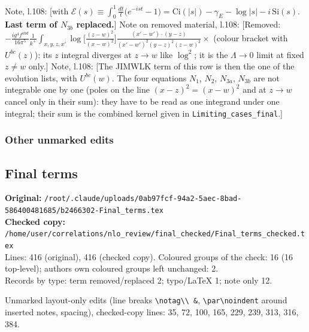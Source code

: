 \documentclass[10pt]{article}
\newenvironment{notebox}{\def\FrameCommand{{\color{notebar}\vrule width 1.5pt}\hspace{6pt}}\MakeFramed{\advance\hsize-\width\FrameRestore}\small}{\endMakeFramed}
\begin{document}
\begin{notebox}\textsf{\small Note, l.108:} [with $\mathcal{E}(s)\equiv\int_{0}^{1}\frac{dt}{t}\big(e^{-ist}-1\big)=\mathrm{Ci}(|s|)-\gamma_{E}-\log|s|-i\,\mathrm{Si}(s)$. \textbf{Last term of $N_{3b}$ replaced.}]\end{notebox}
\begin{notebox}\textsf{\small Note on removed material, l.108:} [Removed: $-\frac{ig^{4}f^{abd}}{16\pi^{5}}\frac{1}{k^{+}}\int_{x,y,z,x'}\log\big[\frac{(z-w)^{2}}{(x-w)^{2}}\big]\frac{(x'-w')\cdot(y-z)}{(x'-w')^{2}(y-z)^{2}(z-w)^{2}}\times$ (colour bracket with $U^{bc}(z)$): its $z$ integral diverges at $z\to w$ like $\log^{2}$; it is the $\Lambda\to0$ limit at fixed $z\neq w$ only.]\end{notebox}
\begin{notebox}\textsf{\small Note, l.108:} [The JIMWLK term of this row is then the one of the evolution lists, with $U^{bc}(w)$. The four equations $N_{1}$, $N_{2}$, $N_{3a}$, $N_{3b}$ are not integrable one by one (poles on the line $(x-z)^{2}=(x-w)^{2}$ and at $z\to w$ cancel only in their sum): they have to be read as one integrand under one integral; their sum is the combined kernel given in \texttt{Limiting\_cases\_final}.]\end{notebox}
\subsubsection*{Other unmarked edits}
\par
{}\par
{}\par
{}\par
{}\bigskip
\subsection{Final terms}\label{sec:file-final_terms}
\noindent\textbf{Original:} \texttt{/root/.claude/uploads/0ab97fcf-94a2-5aec-8bad-586400481685/b2466302-Final\_terms.tex}\\\textbf{Checked copy:} \texttt{/home/user/correlations/nlo\_review/final\_checked/Final\_terms\_checked.tex}\\
Lines: 416 (original), 416 (checked copy). Coloured groups of the check: 16 (16 top-level); author\textquotesingle s own coloured groups left unchanged: 2.\\
Records by type: term removed/replaced 2; typo/LaTeX 1; note only 12.
\par\noindent Unmarked layout-only edits (line breaks \texttt{\textbackslash notag\textbackslash\textbackslash\ \&}, \texttt{\textbackslash par\textbackslash noindent} around inserted notes, spacing), checked-copy lines: 35, 72, 100, 165, 229, 239, 313, 316, 384.
\end{document}
